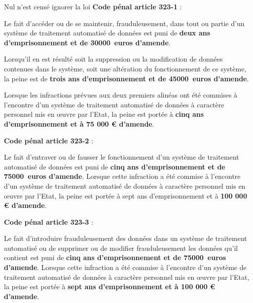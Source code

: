 \documentclass [xcolor=x11names,t] {beamer}
\begin{document}
\begin{frame}{Nul n'est censé ignorer la loi}
		 \textbf{Code pénal article 323-1} :
		 
		Le fait d'accéder ou de se maintenir, frauduleusement, dans tout ou partie d'un système de traitement automatisé de données est puni de \textbf{deux ans d'emprisonnement et de 30000 euros d'amende}. 
		
		Lorsqu'il en est résulté soit la suppression ou la modification de données contenues dans le système, soit une altération du fonctionnement de ce système, la peine est de \textbf{trois ans d'emprisonnement et de 45000 euros d'amende}.
		
		Lorsque les infractions prévues aux deux premiers alinéas ont été commises à l'encontre d'un système de traitement automatisé de données à caractère personnel mis en œuvre par l'Etat, la peine est portée à \textbf{cinq ans d'emprisonnement et à 75 000 € d'amende}.

	\textbf{Code pénal article 323-2} :

		Le fait d'entraver ou de fausser le fonctionnement d'un système de traitement automatisé de données est puni de \textbf{cinq ans d'emprisonnement et de 75000 euros d'amende}. Lorsque cette infraction a été commise à l'encontre d'un système de traitement automatisé de données à caractère personnel mis en œuvre par l'Etat, la peine est portée à sept ans d'emprisonnement et à \textbf{100 000 € d'amende}.
	
	\textbf{Code pénal article 323-3} :
	
		Le fait d'introduire frauduleusement des données dans un système de traitement automatisé ou de supprimer ou de modifier frauduleusement les données qu'il contient est puni de \textbf{cinq ans d'emprisonnement et de 75000 euros d'amende}. Lorsque cette infraction a été commise à l'encontre d'un système de traitement automatisé de données à caractère personnel mis en œuvre par l'Etat, la peine est portée à \textbf{sept ans d'emprisonnement et à 100 000 € d'amende}.
	

\end{frame}
\end{document}
